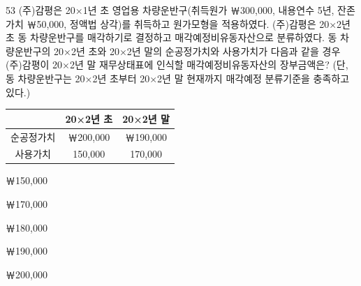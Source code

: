 \begin{question}{53}
(주)감평은 20×1년 초 영업용 차량운반구(취득원가 ￦300,000, 내용연수 5년, 잔존가치 ￦50,000, 정액법 상각)를 취득하고 원가모형을 적용하였다. (주)감평은 20×2년 초 동 차량운반구를 매각하기로 결정하고 매각예정비유동자산으로 분류하였다. 동 차량운반구의 20×2년 초와 20×2년 말의 순공정가치와 사용가치가 다음과 같을 경우 (주)감평이 20×2년 말 재무상태표에 인식할 매각예정비유동자산의 장부금액은? (단, 동 차량운반구는 20×2년 초부터 20×2년 말 현재까지 매각예정 분류기준을 충족하고 있다.)
\par{\small\centering
\begin{tabular}{|c|c|c|}\hline
 & 20×2년 초 & 20×2년 말 \\ \hline
순공정가치 & ￦200,000 & ￦190,000 \\ \hline
사용가치 & 150,000 & 170,000 \\ \hline
\end{tabular}
\par}
\begin{choices}
  \item ￦150,000
  \item ￦170,000
  \item ￦180,000
  \item ￦190,000
  \item ￦200,000
\end{choices}
\end{question}

